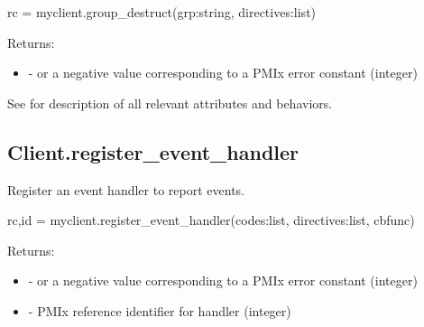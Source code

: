 \format

\pyspecificstart
\begin{codepar}
rc = myclient.group_destruct(grp:string, directives:list)
\end{codepar}
\pyspecificend

\begin{arglist}
\end{arglist}

Returns:

\begin{itemize}
    \item {} -  or a negative value corresponding to a PMIx error constant (integer)
\end{itemize}

See  for description of all relevant attributes and behaviors.


\subsection{Client.register_event_handler}

\summary

Register an event handler to report events.

\format

\pyspecificstart
\begin{codepar}
rc,id = myclient.register_event_handler(codes:list,
                        directives:list, cbfunc)
\end{codepar}
\pyspecificend

\begin{arglist}
\end{arglist}

Returns:

\begin{itemize}
    \item {} -  or a negative value corresponding to a PMIx error constant (integer)
    \item {} - \ac{PMIx} reference identifier for handler (integer)
\end{itemize}


